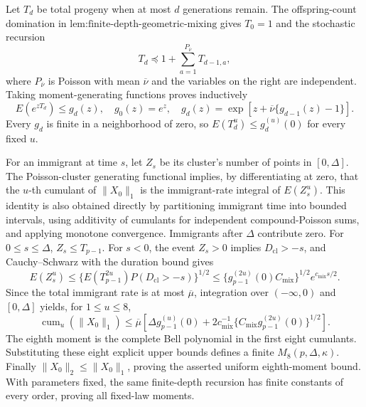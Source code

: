 Let \(T_d\) be total progeny when at most \(d\) generations remain.  The offspring-count domination in \(\text{lem:finite-depth-geometric-mixing}\) gives \(T_0=1\) and the stochastic recursion
\[
 T_d\preceq1+\sum_{a=1}^{P_{\overline\nu}}T_{d-1,a},
\]
where \(P_{\overline\nu}\) is Poisson with mean \(\overline\nu\) and the variables on the right are independent.  Taking moment-generating functions proves inductively
\[
 E(e^{zT_d})\leq g_d(z),\quad g_0(z)=e^z,\quad
 g_d(z)=\exp[z+\overline\nu\{g_{d-1}(z)-1\}].
\]
Every \(g_d\) is finite in a neighborhood of zero, so \(E(T_d^u)\leq g_d^{(u)}(0)\) for every fixed \(u\).

For an immigrant at time \(s\), let \(Z_s\) be its cluster's number of points in \([0,\Delta]\).  The Poisson-cluster generating functional implies, by differentiating at zero, that the \(u\)-th cumulant of \(\|X_0\|_1\) is the immigrant-rate integral of \(E(Z_s^u)\).  This identity is also obtained directly by partitioning immigrant time into bounded intervals, using additivity of cumulants for independent compound-Poisson sums, and applying monotone convergence.  Immigrants after \(\Delta\) contribute zero.  For \(0\leq s\leq\Delta\), \(Z_s\leq T_{p-1}\).  For \(s<0\), the event \(Z_s>0\) implies \(D_{\mathrm{cl}}>-s\), and Cauchy--Schwarz with the duration bound gives
\[
 E(Z_s^u)\leq\{E(T_{p-1}^{2u})P(D_{\mathrm{cl}}>-s)\}^{1/2}
 \leq\{g_{p-1}^{(2u)}(0)C_{\mathrm{mix}}\}^{1/2}e^{c_{\mathrm{mix}}s/2}.
\]
Since the total immigrant rate is at most \(\overline\mu\), integration over \(( -\infty,0)\) and \([0,\Delta]\) yields, for \(1\leq u\leq8\),
\[
 \operatorname{cum}_u(\|X_0\|_1)\leq\overline\mu\left[\Delta g_{p-1}^{(u)}(0)+2c_{\mathrm{mix}}^{-1}
 \{C_{\mathrm{mix}}g_{p-1}^{(2u)}(0)\}^{1/2}\right].
\]
The eighth moment is the complete Bell polynomial in the first eight cumulants.  Substituting these eight explicit upper bounds defines a finite \(M_8(p,\Delta,\kappa)\).  Finally \(\|X_0\|_2\leq\|X_0\|_1\), proving the asserted uniform eighth-moment bound.  With parameters fixed, the same finite-depth recursion has finite constants of every order, proving all fixed-law moments.